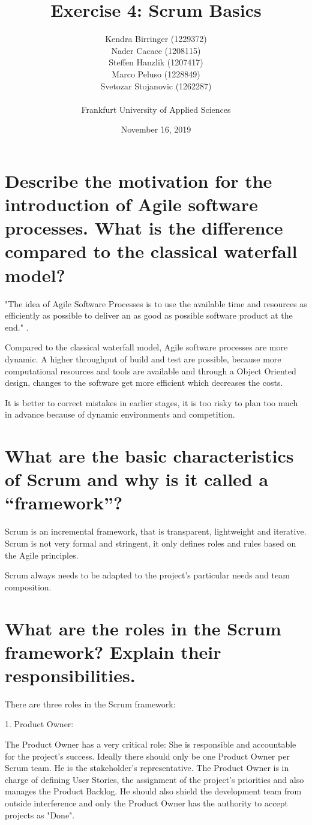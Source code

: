 \documentclass[a4paper, 12pt]{article}
\title{Exercise 4: Scrum Basics}
\author{
    Kendra Birringer (1229372)\\
    Nader Cacace (1208115)\\
    Steffen Hanzlik (1207417)\\
    Marco Peluso (1228849)\\
    Svetozar Stojanovic (1262287)\\
    \\
    Frankfurt University of Applied Sciences
}
\date{November 16, 2019}
\begin{document}
\maketitle
\newpage
\tableofcontents
\newpage

\section{Describe the motivation for the introduction of Agile software processes. What is the difference compared to the classical waterfall model?}

"The idea of Agile Software Processes is to use the available time and resources as efficiently as possible to deliver an as good as possible software product at the end."
\cite{thoma1}.

Compared to the classical waterfall model, Agile software processes are more dynamic. A higher throughput of build and test are possible, because more computational resources and tools are available and through a Object Oriented design, changes to the software get more efficient which decreases the costs.

It is better to correct mistakes in earlier stages, it is too risky to plan too much in advance because of dynamic environments and competition.


\section{What are the basic characteristics of Scrum and why is it called a “framework”?}

Scrum is an incremental framework, that is transparent, lightweight and iterative. 
Scrum is not very formal and stringent, it only defines roles and rules based on the Agile principles. \cite{agileprinciples}

Scrum always needs to be adapted to the project's particular needs and team composition.

\section{What are the roles in the Scrum framework? Explain their responsibilities.}

There are three roles in the Scrum framework:

1. Product Owner:

The Product Owner has a very critical role: She is responsible and accountable for the project's success. Ideally there should only be one Product Owner per Scrum team. He is the stakeholder's representative. 
The Product Owner is in charge of defining User Stories, the assignment of the project's priorities and also manages the Product Backlog. He should also shield the development team from outside interference and only the Product Owner has the authority to accept projects as "Done".
\bigskip
\end{document}
